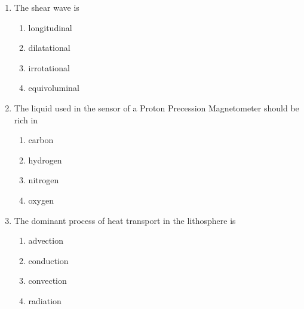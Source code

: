 \documentclass[journal,12pt,onecolumn]{IEEEtran}
\theoremstyle{remark}
\begin{document}
\begin{enumerate}
    \begin{multicols}{2}
        \begin{enumerate}
            \item convergent plate boundary
            \item divergent plate boundary
            \item hot spots
            \item transform fault
        \end{enumerate}
    \end{multicols}

    \item The shear wave is

    \hfill{}
    
    \begin{multicols}{2}
        \begin{enumerate}
            \item longitudinal
            \item dilatational
            \item irrotational
            \item equivoluminal
        \end{enumerate}
    \end{multicols}

    \item The liquid used in the sensor of a Proton Precession Magnetometer should be rich in

    \hfill{}
    
    \begin{multicols}{4}
        \begin{enumerate}
            \item carbon
            \item hydrogen
            \item nitrogen
            \item oxygen
        \end{enumerate}
    \end{multicols}

    \item The dominant process of heat transport in the lithosphere is

    \hfill{}
    
    \begin{multicols}{2}
        \begin{enumerate}
            \item advection
            \item conduction
            \item convection
            \item radiation
        \end{enumerate}
    \end{multicols}


\end{enumerate}
\end{document}
